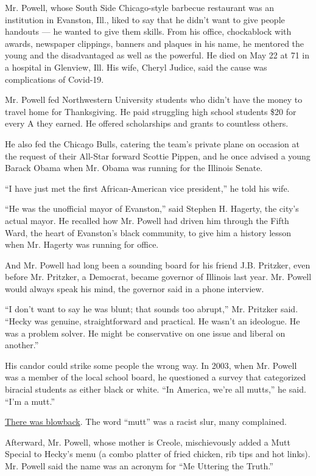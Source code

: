 Mr. Powell, whose South Side Chicago-style barbecue restaurant was an
institution in Evanston, Ill., liked to say that he didn't want to give
people handouts --- he wanted to give them skills. From his office,
chockablock with awards, newspaper clippings, banners and plaques in his
name, he mentored the young and the disadvantaged as well as the
powerful. He died on May 22 at 71 in a hospital in Glenview, Ill. His
wife, Cheryl Judice, said the cause was complications of Covid-19.

Mr. Powell fed Northwestern University students who didn't have the
money to travel home for Thanksgiving. He paid struggling high school
students \$20 for every A they earned. He offered scholarships and
grants to countless others.

He also fed the Chicago Bulls, catering the team's private plane on
occasion at the request of their All-Star forward Scottie Pippen, and he
once advised a young Barack Obama when Mr. Obama was running for the
Illinois Senate.

``I have just met the first African-American vice president,'' he told
his wife.

``He was the unofficial mayor of Evanston,'' said Stephen H. Hagerty,
the city's actual mayor. He recalled how Mr. Powell had driven him
through the Fifth Ward, the heart of Evanston's black community, to give
him a history lesson when Mr. Hagerty was running for office.

And Mr. Powell had long been a sounding board for his friend J.B.
Pritzker, even before Mr. Pritzker, a Democrat, became governor of
Illinois last year. Mr. Powell would always speak his mind, the governor
said in a phone interview.

``I don't want to say he was blunt; that sounds too abrupt,'' Mr.
Pritzker said. ``Hecky was genuine, straightforward and practical. He
wasn't an ideologue. He was a problem solver. He might be conservative
on one issue and liberal on another.''

His candor could strike some people the wrong way. In 2003, when Mr.
Powell was a member of the local school board, he questioned a survey
that categorized biracial students as either black or white. ``In
America, we're all mutts,'' he said. ``I'm a mutt.''

\href{https://dailynorthwestern.com/2003/05/26/archive-manual/i-am-a-mutt/}{There
was blowback}. The word ``mutt'' was a racist slur, many complained.

Afterward, Mr. Powell, whose mother is Creole, mischievously added a
Mutt Special to Hecky's menu (a combo platter of fried chicken, rib tips
and hot links). Mr. Powell said the name was an acronym for ``Me
Uttering the Truth.''

